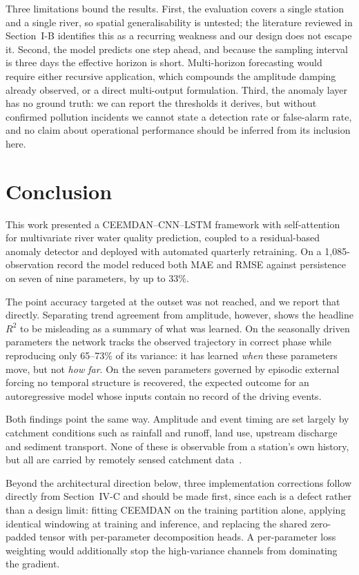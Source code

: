 \documentclass[conference]{IEEEtran}
\begin{document}
Three limitations bound the results. First, the evaluation covers a single
station and a single river, so spatial generalisability is untested; the
literature reviewed in Section~I-B identifies this as a recurring weakness and
our design does not escape it. Second, the model predicts one step ahead, and
because the sampling interval is three days the effective horizon is short.
Multi-horizon forecasting would require either recursive application, which
compounds the amplitude damping already observed, or a direct multi-output
formulation. Third, the anomaly layer has no ground truth: we can report the
thresholds it derives, but without confirmed pollution incidents we cannot
state a detection rate or false-alarm rate, and no claim about operational
performance should be inferred from its inclusion here.

\section{Conclusion}

This work presented a CEEMDAN--CNN--LSTM framework with self-attention for
multivariate river water quality prediction, coupled to a residual-based
anomaly detector and deployed with automated quarterly retraining. On a
1{,}085-observation record the model reduced both MAE and RMSE against
persistence on seven of nine parameters, by up to 33\%.

The point accuracy targeted at the outset was not reached, and we report that
directly. Separating trend agreement from amplitude, however, shows the
headline $R^2$ to be misleading as a summary of what was learned. On the
seasonally driven parameters the network tracks the observed trajectory in
correct phase while reproducing only 65--73\% of its variance: it has learned
\emph{when} these parameters move, but not \emph{how far}. On the seven
parameters governed by episodic external forcing no temporal structure is
recovered, the expected outcome for an autoregressive model whose inputs
contain no record of the driving events.

Both findings point the same way. Amplitude and event timing are set largely by
catchment conditions such as rainfall and runoff, land use, upstream discharge
and sediment transport. None of these is observable from a station's own
history, but all are carried by remotely sensed catchment
data~\cite{sagan,pahlevan}.

Beyond the architectural direction below, three implementation corrections
follow directly from Section~IV-C and should be made first, since each is a
defect rather than a design limit: fitting CEEMDAN on the training partition
alone, applying identical windowing at training and inference, and replacing
the shared zero-padded tensor with per-parameter decomposition heads. A
per-parameter loss weighting would additionally stop the high-variance
channels from dominating the gradient.
\end{document}
